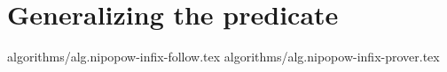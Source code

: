 \section{Generalizing the predicate}

{algorithms/alg.nipopow-infix-follow.tex}
{algorithms/alg.nipopow-infix-prover.tex}
